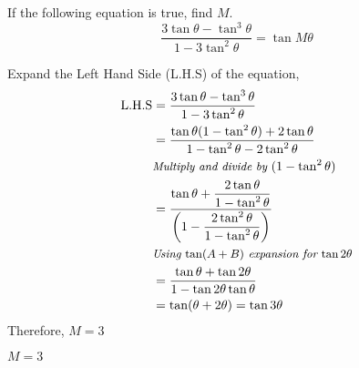 

\question[3] If the following equation is true, find $M$.
  \[\dfrac{3\tan\theta-\tan^3\theta}{1-3\tan^2\theta}=\tan M\theta\]

\begin{solution}[\halfpage]
  Expand the Left Hand Side (L.H.S) of the equation,
  \begin{align}
		\text{L.H.S} &= \dfrac{3\tan\theta-\tan^3\theta}
				           {1-3\tan^2\theta} \\
                 &= \dfrac{\tan\theta(1-\tan^2\theta)+2\tan\theta}
                          {1-\tan^2\theta-2\tan^2\theta} \\
                 &\small{\textit{Multiply and divide by }
                   (1-\tan^2\theta)}\nonumber \\
                 &= \dfrac{\tan\theta+\dfrac{2\tan\theta}{1-\tan^2\theta}}
                          {\left(1-\dfrac{2\tan^2\theta}
                                         {1-\tan^2\theta}\right)} \\
                 &\small{\textit{Using $\tan(A+B)$ expansion for 
                   $\tan 2\theta$}}\nonumber \\
                 &= \dfrac{\tan\theta+\tan 2\theta}
                          {1-\tan 2\theta\tan\theta} \\
                 &= \tan(\theta+2\theta) = \tan 3\theta
  \end{align}
  Therefore, $M=3$

\end{solution}
\ifprintanswers\begin{codex}$M=3$\end{codex}\fi
